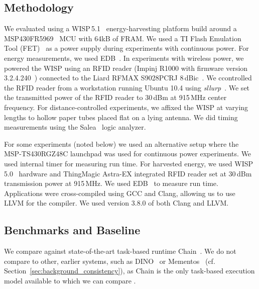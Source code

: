 
\subsection{Methodology}
\label{sec:results_hardware}

We evaluated \sys using a WISP\,5.1~\cite{wisp5,wisp} energy-harvesting
platform build around a MSP430FR5969~\cite{wolverine} MCU with 64kB of FRAM.
We used a TI Flash Emulation Tool (FET)~\cite{fet} as a power supply during
experiments with continuous power.  For energy measurements, we used
EDB~\cite{edb}.  In experiments with wireless power, we powered the WISP using
an RFID reader (Impinj R1000 with firmware version
3.2.4.240~\cite{r1000_data_sheet}) connected to the Liard RFMAX S9028PCRJ
8\,dBic~\cite{atlas2015}. We ccontrolled the RFID reader from a workstation
running Ubuntu 10.4 using \emph{sllurp}~\cite{sllrp_github}.  We set the
transmitted power of the RFID reader to 30\,dBm at 915\,MHz center frequency.
For distance-controlled experiments, we affixed the WISP at varying lengths to
hollow paper tubes placed flat on a lying antenna. We did timing measurements
using the Salea~\cite{saleae} logic analyzer.

For some experiments (noted below) we used an alternative setup where the
MSP-TS430RGZ48C launchpad was used for continuous power experiments. We used
internal timer for measuring run time. For harvested energy, we used
WISP\,5.0~\cite{wisp5,wisp} hardware and ThingMagic Astra-EX integrated RFID
reader set at 30\,dBm transmission power at 915\,MHz.  We used EDB~\cite{edb}
to measure run time. Applications were cross-compiled using GCC and Clang,
allowing us to use LLVM for the \sys compiler. We used version 3.8.0 of both
Clang and LLVM.

\subsection{Benchmarks and Baseline}
\label{sec:results_software}

We compare \sys against state-of-the-art task-based runtime Chain~\cite{chain}.
We do not compare \sys to other, earlier systems, such as DINO~\cite{dino} or
Mementos~\cite{mementos} (cf. Section~\ref{sec:background_consistency}), as
Chain is the only task-based execution model available to which we can compare
\sys. 

